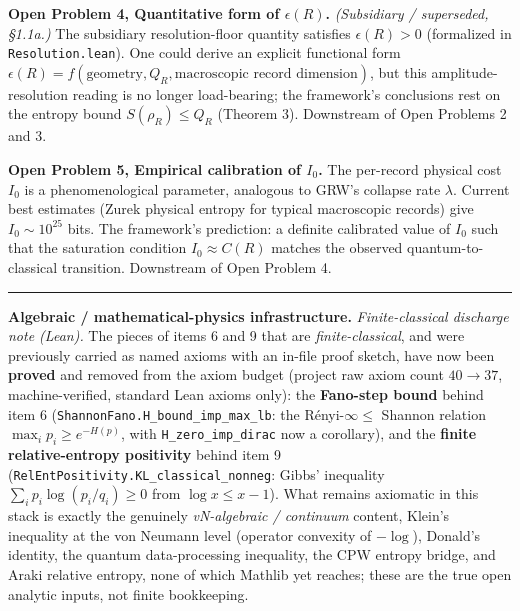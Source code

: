 \documentclass[11pt,a4paper]{article}
\begin{document}
\textbf{Open Problem 4, Quantitative form of $\epsilon(R)$.}
\emph{(Subsidiary / superseded, §1.1a.)} The subsidiary resolution-floor quantity satisfies $\epsilon(R) > 0$ (formalized in \texttt{Resolution.lean}). One could derive an explicit functional form $\epsilon(R) = f(\text{geometry}, Q_R, \text{macroscopic record dimension})$, but this amplitude-resolution reading is no longer load-bearing; the framework's conclusions rest on the entropy bound $S(\rho_R) \le Q_R$ (Theorem 3). Downstream of Open Problems 2 and 3.

\textbf{Open Problem 5, Empirical calibration of $I_0$.}
The per-record physical cost $I_0$ is a phenomenological parameter, analogous to GRW's collapse rate $\lambda$. Current best estimates (Zurek physical entropy for typical macroscopic records) give $I_0 \sim 10^{25}$ bits. The framework's prediction: a definite calibrated value of $I_0$ such that the saturation condition $I_0 \approx C(R)$ matches the observed quantum-to-classical transition. Downstream of Open Problem 4.

\medskip\hrule\medskip

\textbf{Algebraic / mathematical-physics infrastructure.} \emph{Finite-classical discharge note (Lean).} The pieces of items 6 and 9 that are \emph{finite-classical}, and were previously carried as named axioms with an in-file proof sketch, have now been \textbf{proved} and removed from the axiom budget (project raw axiom count $40 \to 37$, machine-verified, standard Lean axioms only): the \textbf{Fano-step bound} behind item 6 (\texttt{ShannonFano.H\_bound\_imp\_max\_lb}: the Rényi-$\infty \le$ Shannon relation $\max_i p_i \ge e^{-H(p)}$, with \texttt{H\_zero\_imp\_dirac} now a corollary), and the \textbf{finite relative-entropy positivity} behind item 9 (\texttt{RelEntPositivity.KL\_classical\_nonneg}: Gibbs' inequality $\sum_i p_i\log(p_i/q_i)\ge 0$ from $\log x \le x-1$). What remains axiomatic in this stack is exactly the genuinely \emph{vN-algebraic / continuum} content, Klein's inequality at the von Neumann level (operator convexity of $-\log$), Donald's identity, the quantum data-processing inequality, the CPW entropy bridge, and Araki relative entropy, none of which Mathlib yet reaches; these are the true open analytic inputs, not finite bookkeeping.
\end{document}
